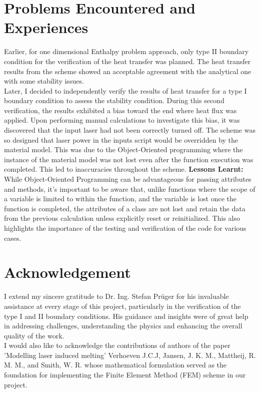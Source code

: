 \section{Problems Encountered and Experiences\label{sec:problems}}

Earlier, for one dimensional Enthalpy problem approach, only type II boundary condition for the verification of the heat transfer was planned. The heat transfer results from the scheme showed an acceptable agreement with the analytical one with some stability issues.\\
Later, I decided to independently verify the results of heat transfer for a type I boundary condition to assess the stability condition. During this second verification, the results exhibited a bias toward the end where heat flux was applied. Upon performing manual calculations to investigate this bias, it was discovered that the input laser had not been correctly turned off. The scheme was so designed that laser power in the inputs script would be overridden by the material model. This was due to the Object-Oriented programming where the instance of the material model was not lost even after the function execution was completed. This led to inaccuracies throughout the scheme. 
\textbf{Lessons Learnt:} While Object-Oriented Programming can be advantageous for passing attributes and methods, it's important to be aware that, unlike functions where the scope of a variable is limited to within the function, and the variable is lost once the function is completed, the attributes of a class are not lost and retain the data from the previous calculation unless explicitly reset or reinitialized. This also highlights the importance of the testing and verification of the code for various cases.

\section{Acknowledgement\label{sec:Acknowledgement}}

I extend my sincere gratitude to Dr. Ing. Stefan Prüger for his invaluable assistance at every stage of this project, particularly in the verification of the type I and II boundary conditions. His guidance and insights were of great help in addressing challenges, understanding the physics and enhancing the overall quality of the work.\\

I would also like to acknowledge the contributions of authors of the paper 'Modelling laser induced melting'  Verhoeven J.C.J, Jansen, J. K. M., Mattheij, R. M. M., and Smith, W. R. whose mathematical formulation served as the foundation for implementing the Finite Element Method (FEM) scheme in our project.\\

